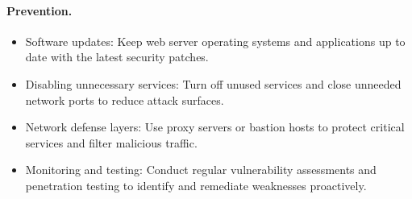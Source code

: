 \paragraph{Prevention.}
\begin{itemize}
  \item Software updates: Keep web server operating systems and applications up to date with the latest security patches.
  \item Disabling unnecessary services: Turn off unused services and close unneeded network ports to reduce attack surfaces.
  \item Network defense layers: Use proxy servers or bastion hosts to protect critical services and filter malicious traffic.
  \item Monitoring and testing: Conduct regular vulnerability assessments and penetration testing to identify and remediate weaknesses proactively.
\end{itemize}
